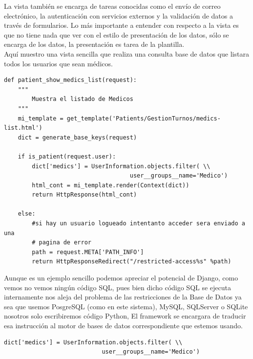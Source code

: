 La vista también se encarga de tareas conocidas como el enví­o de correo electrónico, la autenticación con servicios externos y la validación de datos a través de formularios. Lo más importante a entender con respecto  a la  vista es que no tiene nada que ver con el estilo de presentación de los  datos, sólo se encarga de los datos, la presentación es tarea de la plantilla.\\[0.1cm]


Aquí muestro una vista sencilla que realiza una consulta base de datos que listara todos los usuarios que sean médicos. \\[0.1cm]

\begin{lstlisting}[style=Python]
def patient_show_medics_list(request):
    """
        Muestra el listado de Medicos
    """
    mi_template = get_template('Patients/GestionTurnos/medics-list.html')
    dict = generate_base_keys(request)

    if is_patient(request.user):
        dict['medics'] = UserInformation.objects.filter( \\
                                    user__groups__name='Medico')
        html_cont = mi_template.render(Context(dict))
        return HttpResponse(html_cont)

    else:
        #si hay un usuario logueado intentanto acceder sera enviado a una
        # pagina de error
        path = request.META['PATH_INFO']
        return HttpResponseRedirect("/restricted-access%s" %path)
\end{lstlisting}

\vspace{0.1cm}

Aunque es un ejemplo sencillo podemos apreciar el potencial de Django, como vemos no vemos ningún código SQL, pues bien dicho código SQL se ejecuta internamente nos aleja del problema de las restricciones de la Base de Datos ya sea que usemos PosgreSQL (como en este sistema), MySQL, SQLServer o SQLite nosotros solo escribiremos código Python, El framework se encargara de traducir esa instrucción al motor de bases de datos correspondiente que estemos usando.\\[0.2cm]

\begin{lstlisting}[style=consola]
dict['medics'] = UserInformation.objects.filter( \\
                            user__groups__name='Medico')
\end{lstlisting}

